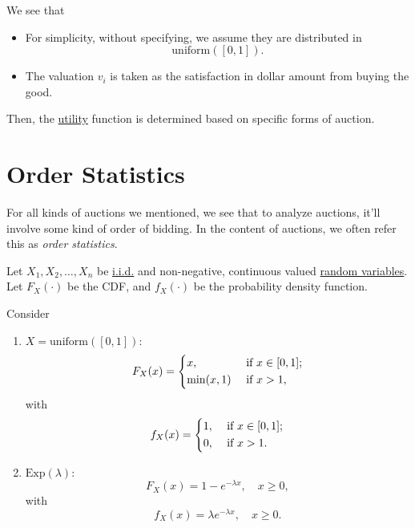 \begin{note}
	We see that
	\begin{itemize}
		\item For simplicity, without specifying, we assume they are distributed in
		      \[
			      \mathrm{uniform} ([0, 1]).
		      \]
		\item The valuation \(v_{i}\) is taken as the satisfaction in dollar amount from buying the good.
	\end{itemize}
\end{note}

Then, the \hyperref[def:reward]{utility} function is determined based on specific forms of auction.

\section{Order Statistics}
For all kinds of auctions we mentioned, we see that to analyze auctions, it'll involve some kind of order of bidding. In the
content of auctions, we often refer this as \emph{order statistics}.

Let \(X_1, X_2, \ldots , X_n\) be \hyperref[def:i.i.d.]{i.i.d.} and non-negative, continuous valued \hyperref[def:random-variable]{random variables}. Let
\(F_{X}(\cdot)\) be the CDF, and \(f_{X}(\cdot)\) be the probability density function.
\begin{eg}
	Consider
	\begin{enumerate}
		\item \(X = \mathrm{uniform}([0, 1])\):
		      \[
			      F_X(x) = \begin{dcases}
				      x,         & \text{ if } x\in[0, 1]; \\
				      \min(x, 1) & \text{ if }x>1,         \\
			      \end{dcases}
		      \]
		      with
		      \[
			      f_X(x) = \begin{dcases}
				      1, & \text{ if } x\in[0, 1]; \\
				      0, & \text{ if }x>1.
			      \end{dcases}
		      \]
		\item \(\mathrm{Exp}(\lambda)\):
		      \[
			      F_X(x) = 1 - e^{-\lambda x}, \quad x\geq 0,
		      \]
		      with
		      \[
			      f_X(x) = \lambda e^{-\lambda x},\quad x\geq 0.
		      \]
	\end{enumerate}
\end{eg}


